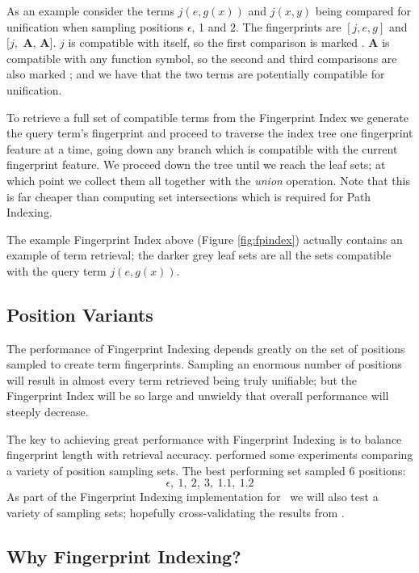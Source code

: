 As an example consider the terms $j(e, g(x))$ and $j(x,y)$ being compared for unification
when sampling positions $\epsilon$, 1 and 2. The fingerprints are $[j, e, g]$ and $[j,$ \textbf{A}, \textbf{A}$]$. 
$j$ is compatible with itself, so the first comparison is marked \compY. \textbf{A} is compatible with
any function symbol, so the second and third comparisons are also marked \compY; and
we have that the two terms are potentially compatible for unification.

To retrieve a full set of compatible terms from the Fingerprint Index we generate
the query term's fingerprint and proceed to traverse the index tree one fingerprint
feature at a time, going down any branch which is compatible with the current
fingerprint feature. We proceed down the tree until we reach the leaf sets; at which
point we collect them all together with the \emph{union} operation. Note that this
is far cheaper than computing set intersections which is required for Path Indexing.

The example Fingerprint Index above (Figure \ref{fig:fpindex}) actually contains an example of term retrieval;
the darker grey leaf sets are all the sets compatible with the query term $j(e, g(x))$.

\subsection{Position Variants}

The performance of Fingerprint Indexing depends greatly on the set of positions sampled
to create term fingerprints. Sampling an enormous number of positions will result in
almost every term retrieved being truly unifiable; but the Fingerprint Index will
be so large and unwieldy that overall performance will steeply decrease.

The key to achieving great performance with Fingerprint Indexing is to balance
fingerprint length with retrieval accuracy.  performed some experiments
comparing a variety of position sampling sets. The best performing set sampled
6 positions:
  \[\epsilon,\  1,\  2,\  3,\  1.1,\  1.2\]
As part of the Fingerprint Indexing implementation for \beagle\ we will also test
a variety of sampling sets; hopefully cross-validating the results from .

\subsection{Why Fingerprint Indexing?}

